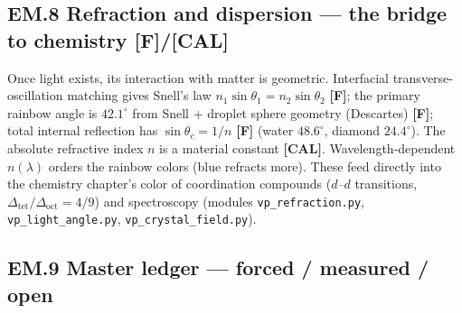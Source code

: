 \documentclass[
  10pt,
]{article}
\begin{document}
\hypertarget{em.8-refraction-and-dispersion-the-bridge-to-chemistry-fcal}{%
\subsection{\texorpdfstring{EM.8 Refraction and dispersion --- the
bridge to chemistry
\textbf{{[}F{]}/{[}CAL{]}}}{EM.8 Refraction and dispersion --- the bridge to chemistry {[}F{]}/{[}CAL{]}}}\label{em.8-refraction-and-dispersion-the-bridge-to-chemistry-fcal}}

Once light exists, its interaction with matter is geometric. Interfacial
transverse-oscillation matching gives Snell's law
\(n_1\sin\theta_1 = n_2\sin\theta_2\) \textbf{{[}F{]}}; the primary
rainbow angle is \(42.1^\circ\) from Snell + droplet sphere geometry
(Descartes) \textbf{{[}F{]}}; total internal reflection has
\(\sin\theta_c = 1/n\) \textbf{{[}F{]}} (water \(48.6^\circ\), diamond
\(24.4^\circ\)). The absolute refractive index \(n\) is a material
constant \textbf{{[}CAL{]}}. Wavelength-dependent \(n(\lambda)\) orders
the rainbow colors (blue refracts more). These feed directly into the
chemistry chapter's color of coordination compounds (\(d\)--\(d\)
transitions, \(\Delta_{\text{tet}}/\Delta_{\text{oct}} = 4/9\)) and
spectroscopy (modules \texttt{vp\_refraction.py},
\texttt{vp\_light\_angle.py}, \texttt{vp\_crystal\_field.py}).

\hypertarget{em.9-master-ledger-forced-measured-open}{%
\subsection{EM.9 Master ledger --- forced / measured /
open}\label{em.9-master-ledger-forced-measured-open}}
\end{document}
